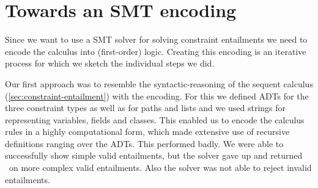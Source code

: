 \documentclass[a4paper]{article}
\begin{document}
\section{Towards an SMT encoding}
Since we want to use a SMT solver for solving constraint entailments we need to
encode the calculus into (first-order) logic.
Creating this encoding is an iterative process for which we sketch the individual steps
we did.

Our first approach was to resemble the syntactic-reasoning of the sequent calculus (\ref{sec:constraint-entailment}) with the encoding.
For this we defined ADTs for the three constraint types as well as for paths and lists
and we used strings for representing variables, fields and classes.
This enabled us to encode the calculus rules in a highly computational form,
which made extensive use of recursive definitions ranging over the ADTs.
This performed badly. We were able to successfully show simple valid entailments,
but the solver gave up and returned \unknown~on more complex valid entailments.
Also the solver was not able to reject invalid entailments.
\end{document}
